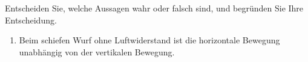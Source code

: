 \begin{ExerciseBlock}
Entscheiden Sie, welche Aussagen wahr oder falsch sind, und begründen Sie Ihre Entscheidung.
\begin{enumerate}
\item Beim schiefen Wurf ohne Luftwiderstand ist die horizontale Bewegung unabhängig von der vertikalen Bewegung.
\end{enumerate}
\end{ExerciseBlock}
